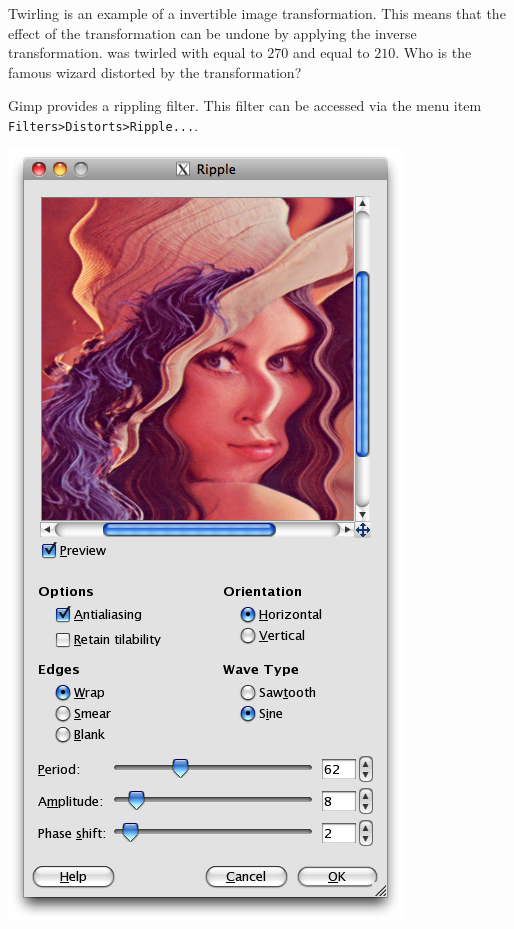 \documentclass{book}
\begin{document}
\begin{exercise}
Twirling is an example of a invertible image transformation. This means that the effect of the transformation can be undone by applying the inverse transformation.  was twirled with  equal to $270$ and  equal to $210$. Who is the famous wizard distorted by the transformation?
\end{exercise}

\begin{exercise}
Gimp provides a rippling filter. This filter can be accessed via the menu item \texttt{Filters>Distorts>Ripple...}.
\begin{center}
\includegraphics[scale=0.2]{gimp-rippling.png} 
\end{center}

\end{exercise}
\end{document}
